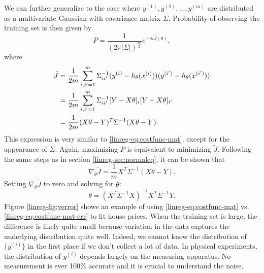 \documentclass{article}
\theoremstyle{definition}
\begin{document}
We can further generalize to the case where $y^{(1)}, y^{(2)}, \dots, y^{(m)}$ are distributed as a multivariate Gaussian with covariance matrix $\Sigma$. Probability of observing the training set is then given by
\begin{equation}
    P = \frac{1}{(2\pi|\Sigma|)^{\frac{m}{2}}} e^{-m\tilde{J}(\theta)},
\end{equation}
where
\begin{align}
    \tilde{J} &= \frac{1}{2m}\sum_{i,i'=1}^{m}\Sigma^{-1}_{ii'}(y^{(i)} - h_{\theta}(x^{(i)}))(y^{(i')} - h_{\theta}(x^{(i')}))\notag\\
    &= \frac{1}{2m}\sum_{i,i'=1}^{m}\Sigma^{-1}_{ii'}[Y - X\theta]_i[Y - X\theta]_{i'}\notag\\
    &= \frac{1}{2m}(X\theta-Y)^T\Sigma^{-1}(X\theta-Y).
\end{align}
This expression is very similar to \eqref{linreg-eq:costfunc-mat}, except for the appearance of $\Sigma$. Again, maximizing $P$ is equivalent to minimizing $\tilde{J}$. Following the same steps as in section \ref{linreg-sec:normaleq}, it can be shown that
\begin{equation}
    \nabla_{\theta}\tilde{J}=\frac{1}{m}X^T\Sigma^{-1}(X\theta-Y).
\end{equation}
Setting $\nabla_{\theta}\tilde{J}$ to zero and solving for $\theta$:
\begin{equation}
    \theta = (X^T\Sigma^{-1}X)^{-1}X^T\Sigma^{-1}Y.
    \label{linreg-eq:costfunc-mat-err}
\end{equation}
Figure \ref{linreg-fig:yerror} shows an example of using \eqref{linreg-eq:costfunc-mat} vs. \eqref{linreg-eq:costfunc-mat-err} to fit house prices. When the training set is large, the difference is likely quite small because variation in the data captures the underlying distribution quite well. Indeed, we cannot know the distribution of $\{y^{(i)}\}$ in the first place if we don't collect a lot of data. In physical experiments, the distribution of $y^{(i)}$ depends largely on the measuring apparatus. No measurement is ever 100\% accurate and it is crucial to understand the noise.
\end{document}
